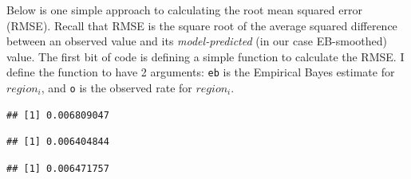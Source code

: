 \documentclass[
]{book}
\newenvironment{Shaded}{\begin{snugshade}}{\end{snugshade}}
\newcommand{\ControlFlowTok}[1]{\textcolor[rgb]{0.13,0.29,0.53}{\textbf{#1}}}
\newcommand{\DecValTok}[1]{\textcolor[rgb]{0.00,0.00,0.81}{#1}}
\newcommand{\FunctionTok}[1]{\textcolor[rgb]{0.13,0.29,0.53}{\textbf{#1}}}
\newcommand{\NormalTok}[1]{#1}
\newcommand{\OtherTok}[1]{\textcolor[rgb]{0.56,0.35,0.01}{#1}}
\newcommand{\SpecialCharTok}[1]{\textcolor[rgb]{0.81,0.36,0.00}{\textbf{#1}}}
\begin{document}
Below is one simple approach to calculating the root mean squared error (RMSE). Recall that RMSE is the square root of the average squared difference between an observed value and its \emph{model-predicted} (in our case EB-smoothed) value. The first bit of code is defining a simple function to calculate the RMSE. I define the function to have 2 arguments: \texttt{eb} is the Empirical Bayes estimate for \(region_i\), and \texttt{o} is the observed rate for \(region_i\).

\begin{Shaded}
\end{Shaded}

\begin{verbatim}
## [1] 0.006809047
\end{verbatim}

\begin{Shaded}
\end{Shaded}

\begin{verbatim}
## [1] 0.006404844
\end{verbatim}

\begin{Shaded}
\end{Shaded}

\begin{verbatim}
## [1] 0.006471757
\end{verbatim}

\begin{Shaded}
\end{Shaded}
\end{document}
